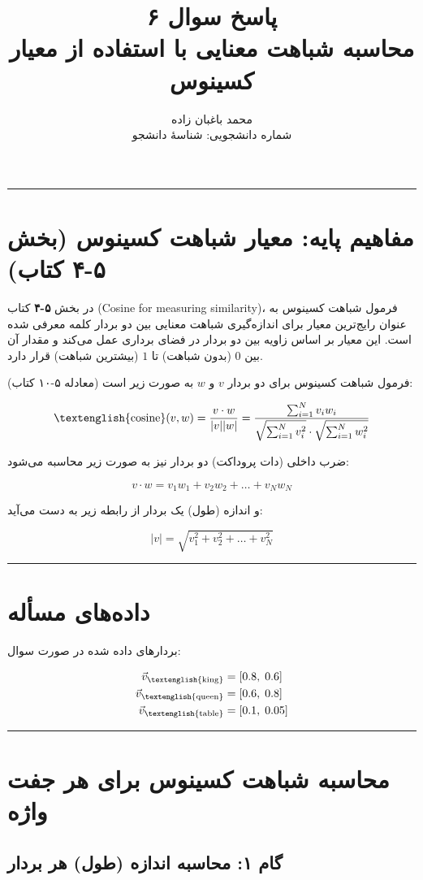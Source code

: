 \documentclass[11pt,a4paper]{article}
\title{\textbf{پاسخ سوال ۶} \\[0.4cm] \small محاسبه شباهت معنایی با استفاده از معیار کسینوس}
\author{محمد باغبان زاده \\ شماره دانشجویی: شناسهٔ دانشجو}
\date{}
\newcommand{\en}[1]{\textenglish{#1}}
\newcommand{\thickseparator}{\vspace{1em}\noindent\rule{\linewidth}{1pt}\vspace{1em}}
\begin{document}
\maketitle
\thickseparator

\section{مفاهیم پایه: معیار شباهت کسینوس (بخش \en{۵-۴} کتاب)}

در بخش \textbf{\en{۵-۴}} کتاب (\en{Cosine for measuring similarity})، فرمول شباهت کسینوس به عنوان رایج‌ترین معیار برای اندازه‌گیری شباهت معنایی بین دو بردار کلمه معرفی شده است. این معیار بر اساس زاویه بین دو بردار در فضای برداری عمل می‌کند و مقدار آن بین \(0\) (بدون شباهت) تا \(1\) (بیشترین شباهت) قرار دارد.

فرمول شباهت کسینوس برای دو بردار \(v\) و \(w\) به صورت زیر است (معادله \en{۵-۱۰} کتاب):

\[
\text{\en{cosine}}(v,w) = \frac{v \cdot w}{|v||w|} = \frac{\sum_{i=1}^{N} v_i w_i}{\sqrt{\sum_{i=1}^{N} v_i^2} \cdot \sqrt{\sum_{i=1}^{N} w_i^2}}
\]

ضرب داخلی (دات پروداکت) دو بردار نیز به صورت زیر محاسبه می‌شود:

\[
v \cdot w = v_1 w_1 + v_2 w_2 + \dots + v_N w_N
\]

و اندازه (طول) یک بردار از رابطه زیر به دست می‌آید:

\[
|v| = \sqrt{v_1^2 + v_2^2 + \dots + v_N^2}
\]

\thickseparator

\section{داده‌های مسأله}

بردارهای داده شده در صورت سوال:

\begin{align*}
\vec{v}_{\text{\en{king}}} &= [0.8,\; 0.6] \\
\vec{v}_{\text{\en{queen}}} &= [0.6,\; 0.8] \\
\vec{v}_{\text{\en{table}}} &= [0.1,\; 0.05]
\end{align*}

\thickseparator

\section{محاسبه شباهت کسینوس برای هر جفت واژه}

\subsection{گام ۱: محاسبه اندازه (طول) هر بردار}
\end{document}
